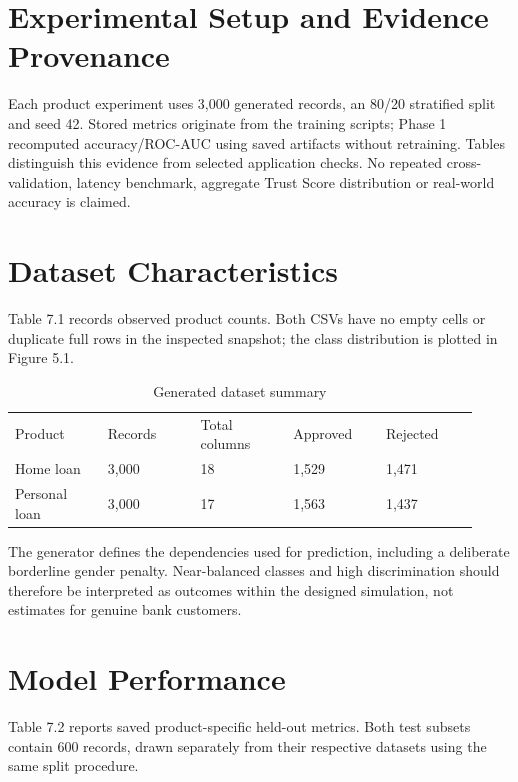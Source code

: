 \documentclass[12pt,a4paper]{report}
\begin{document}
\section{Experimental Setup and Evidence Provenance}
Each product experiment uses 3,000 generated records, an 80/20 stratified split and seed 42. Stored metrics originate from the training scripts; Phase 1 recomputed accuracy/ROC-AUC using saved artifacts without retraining. Tables distinguish this evidence from selected application checks. No repeated cross-validation, latency benchmark, aggregate Trust Score distribution or real-world accuracy is claimed.

\section{Dataset Characteristics}
Table 7.1 records observed product counts. Both CSVs have no empty cells or duplicate full rows in the inspected snapshot; the class distribution is plotted in Figure 5.1.

\begin{longtable}{p{0.184\linewidth}p{0.184\linewidth}p{0.184\linewidth}p{0.184\linewidth}p{0.184\linewidth}}
\caption{Generated dataset summary}\\

Product & Records & Total columns & Approved & Rejected\\
Home loan & 3,000 & 18 & 1,529 & 1,471\\
Personal loan & 3,000 & 17 & 1,563 & 1,437\\
\end{longtable}
The generator defines the dependencies used for prediction, including a deliberate borderline gender penalty. Near-balanced classes and high discrimination should therefore be interpreted as outcomes within the designed simulation, not estimates for genuine bank customers.

\section{Model Performance}
Table 7.2 reports saved product-specific held-out metrics. Both test subsets contain 600 records, drawn separately from their respective datasets using the same split procedure.
\end{document}
